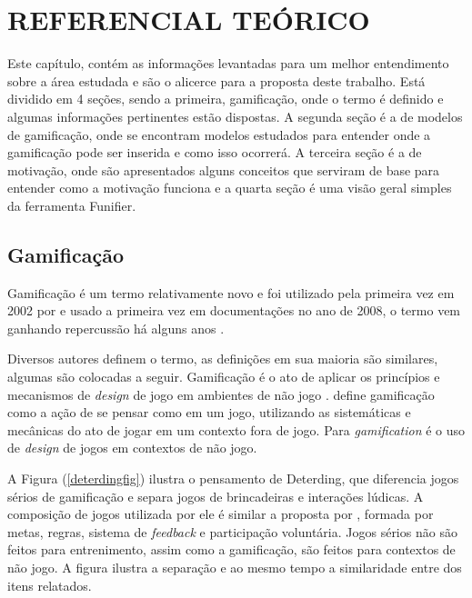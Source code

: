 \chapter[Referencial Teórico]{REFERENCIAL TEÓRICO}

Este capítulo, contém as informações levantadas para um melhor entendimento sobre a área estudada e são o alicerce para a proposta deste trabalho. Está dividido em 4 seções, sendo a primeira, gamificação, onde o termo é definido e algumas informações pertinentes estão dispostas. A segunda seção é a de modelos de gamificação, onde se encontram modelos estudados para entender onde a gamificação pode ser inserida e como isso ocorrerá. A terceira seção é a de motivação, onde são apresentados alguns conceitos que serviram de base para entender como a motivação funciona e a quarta seção é uma visão geral simples da ferramenta Funifier. 

\section{Gamificação}

Gamificação é um termo relativamente novo e foi utilizado pela primeira vez em 2002 por \cite{pelling} e usado a primeira vez em documentações no ano de 2008, o termo vem ganhando repercussão há alguns anos \cite{deterding2011gamification}.

Diversos autores definem o termo, as definições em sua maioria são similares, algumas são colocadas a seguir. Gamificação é o ato de aplicar os princípios e mecanismos de \textit{design}   de jogo em ambientes de não jogo \cite{kumar2013gamification}.
\cite{da2014gamificaccao} define gamificação como a ação de se pensar como em um jogo, utilizando as sistemáticas e mecânicas do ato de jogar em um contexto fora de jogo. Para \cite{deterding2011gamification} \textit{gamification} é o uso de \textit{design}  de jogos em contextos de não jogo. 

A Figura (\ref{deterdingfig}) ilustra o pensamento de Deterding, que diferencia jogos sérios de gamificação e separa jogos de brincadeiras e interações lúdicas. A composição de jogos utilizada por ele é similar a proposta por \cite{mcgonigal2011reality}, formada por metas, regras, sistema de \textit{feedback} e participação voluntária. Jogos sérios não são feitos para entrenimento, assim como a gamificação, são feitos para contextos de não jogo. A figura ilustra a separação e ao mesmo tempo a similaridade entre dos itens relatados. 


